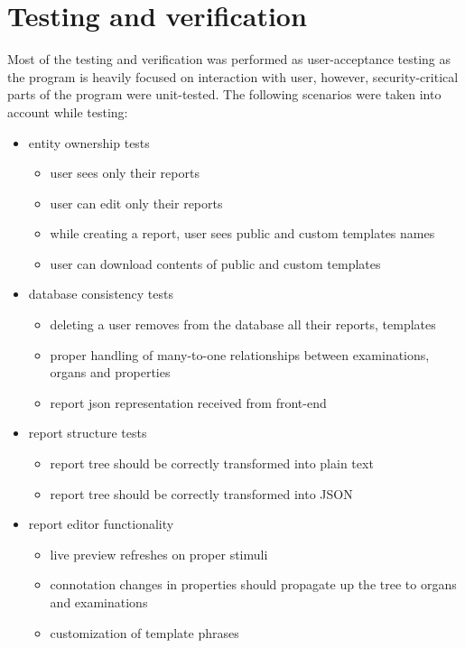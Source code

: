 \documentclass[12pt, twoside, openany]{report}
\theoremstyle{definition}
\begin{document}
\chapter{Testing and verification}
Most of the testing and verification was performed as user-acceptance testing as the program is heavily focused on interaction with user, however, security-critical parts of the program were unit-tested.
The following scenarios were taken into account while testing:
\begin{itemize}
	\item entity ownership tests
	\begin{itemize}
		\item user sees only their reports
		\item user can edit only their reports
		\item while creating a report, user sees public and custom templates names
		\item user can download contents of public and custom templates
	\end{itemize}

	\item database consistency tests
	\begin{itemize}
		\item deleting a user removes from the database all their reports, templates
		\item proper handling of many-to-one relationships between examinations, organs and properties
		\item report json representation received from front-end
	\end{itemize}
	
	\item report structure tests
	\begin{itemize}
		\item report tree should be correctly transformed into plain text
		\item report tree should be correctly transformed into JSON
	\end{itemize}

	\item report editor functionality
	\begin{itemize}
		\item live preview refreshes on proper stimuli
		\item connotation changes in properties should propagate up the tree to organs and examinations
		\item customization of template phrases
	\end{itemize}

\end{itemize}
\end{document}

